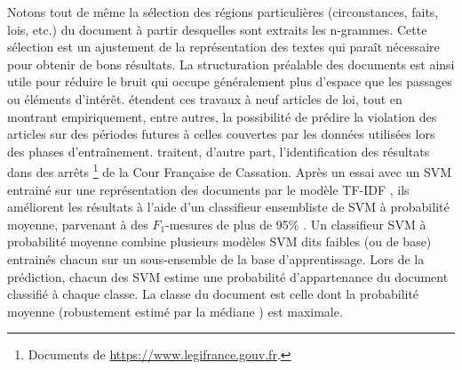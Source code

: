 Notons tout de même la sélection des régions particulières (circonstances, faits, lois, etc.) du document à partir desquelles sont extraits les n-grammes. Cette sélection est un ajustement de la représentation des textes qui paraît nécessaire pour obtenir de bons résultats. La structuration préalable des documents est ainsi utile pour réduire le bruit qui occupe généralement plus d'espace que les passages ou éléments d'intérêt.  \citet{medvedeva2018echrCristalBall} étendent ces travaux à neuf articles de loi, tout en montrant empiriquement, entre autres, la possibilité de prédire la violation des articles sur des périodes futures à celles couvertes par les données utilisées lors des phases d'entraînement. \cite{sulea2017legalEnsSVM} traitent, d'autre part, l'identification des résultats dans des arrêts \footnote{Documents de \url{https://www.legifrance.gouv.fr}.} de la Cour Française de Cassation. Après un essai \citep{Sulea2017predictareadecision} avec un SVM entrainé sur une représentation des documents par le modèle  TF-IDF \citep{salton1988term-weighting}, ils améliorent les résultats à l'aide d'un classifieur ensembliste de SVM à probabilité moyenne,
 parvenant à des $F_1$-mesures de plus de 95\% \cite{sulea2017legalEnsSVM}. Un classifieur SVM à probabilité moyenne combine plusieurs modèles SVM dits \og faibles \fg{} (ou de base)  entrainés chacun sur un sous-ensemble de la base d'apprentissage.
Lors de la prédiction, chacun des SVM estime une probabilité d'appartenance du document classifié à chaque classe. La classe du document est celle dont la  probabilité moyenne (robustement estimé par la médiane \citep{kittler1998combiningClassifiers}) est maximale.

